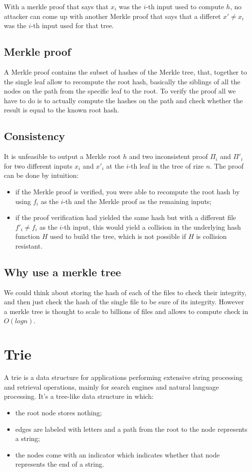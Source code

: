 With a merkle proof that says that $x_i$ was the $i$-th input used to compute $h$, no attacker can come up with another Merkle proof that says that a differet $x' \neq x_i$ was the $i$-th input used for that tree. 

\subsection{Merkle proof}
A Merkle proof contains the subset of hashes of the Merkle tree, that, together to the single leaf allow to recompute the root hash, basically the siblings of all the nodes on the path from the specific leaf to the root.
To verify the proof all we have to do is to actually compute the hashes on the path and check whether the result is equal to the known root hash.

\subsection{Consistency}
It is unfeasible to output a Merkle root $h$ and two inconsistent proof $\Pi_i$ and $\Pi'_i$ for two different inputs $x_i$ and $x'_i$ at the $i$-th leaf in the tree of rize $n$.
The proof can be done by intuition:
\begin{itemize}
    \item if the Merkle proof is verified, you were able to recompute the root hash by using $f_i$ as the $i$-th and the Merkle proof as the remaining inputs;
    \item if the proof verification had yielded the same hash but with a different file $f'_i \neq f_i$ as the $i$-th input, this would yield a collision in the underlying hash function $H$ used to build the tree, which is not possible if $H$ is collision resistant.
\end{itemize}

\subsection{Why use a merkle tree}
We could think about storing the hash of each of the files to check their integrity, and then just check the hash of the single file to be sure of its integrity.
However a merkle tree is thought to scale to billions of files and allows to compute check in $O(log n)$.

\section{Trie}
A trie is a data structure for applications performing extensive string processing and retrieval operations, mainly for search engines and natural language processing.
It's a tree-like data structure in which:
\begin{itemize}
    \item the root node stores nothing;
    \item edges are labeled with letters and a path from the root to the node represents a string;
    \item the nodes come with an indicator which indicates whether that node represents the end of a string.
\end{itemize}

